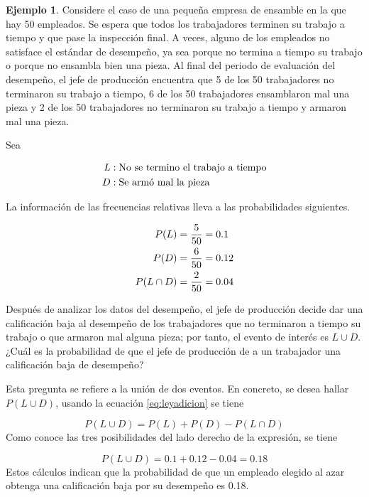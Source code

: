 \documentclass[
  11pt,
]{book}
\theoremstyle{definition}
\theoremstyle{definition}
\newtheorem{example}{Ejemplo}[chapter]
\theoremstyle{definition}
\theoremstyle{definition}
\theoremstyle{remark}
\begin{document}
\begin{enumerate}
  \begin{example}
  Considere el caso de una pequeña empresa de ensamble en la que hay 50 empleados. Se espera que todos los trabajadores terminen su trabajo a tiempo y que pase la inspección final. A veces, alguno de los empleados no satisface el estándar de desempeño, ya sea porque no termina a tiempo su trabajo o porque no ensambla bien una pieza. Al final del periodo de evaluación del desempeño, el jefe de producción encuentra que 5 de los 50 trabajadores no terminaron su trabajo a tiempo, 6 de los 50 trabajadores ensamblaron mal una pieza y 2 de los 50 trabajadores no terminaron su trabajo a tiempo y armaron mal una pieza.

  Sea

  \begin{equation}
  \notag
  \begin{split}
  L &: \text{No se termino el trabajo a tiempo}\\
  D &: \text{Se armó mal la pieza}\\
  \end{split}
  \end{equation}

  La información de las frecuencias relativas lleva a las probabilidades siguientes.

  \begin{equation}
  \notag
  \begin{split}
  P(L) &= \frac{5}{50} = 0.1\\
  P(D) &= \frac{6}{50} = 0.12\\
  P(L\cap D) &= \frac{2}{50} = 0.04\\
  \end{split}
  \end{equation}

  Después de analizar los datos del desempeño, el jefe de producción decide dar una calificación baja al desempeño de los trabajadores que no terminaron a tiempo su trabajo o que armaron mal alguna pieza; por tanto, el evento de interés es \(L \cup D\). ¿Cuál es la probabilidad de que el jefe de producción de a un trabajador una calificación baja de desempeño?

  Esta pregunta se refiere a la unión de dos eventos. En concreto, se desea hallar \(P(L\cup D)\), usando la ecuación \eqref{eq:leyadicion} se tiene

  \[P(L\cup D) = P(L) + P(D) - P(L\cap D)\]
  Como conoce las tres posibilidades del lado derecho de la expresión, se tiene

  \[P(L\cup D) = 0.1 + 0.12 - 0.04 = 0.18\]
  Estos cálculos indican que la probabilidad de que un empleado elegido al azar obtenga una calificación baja por su desempeño es 0.18.
  \end{example}


\end{enumerate}
\end{document}
